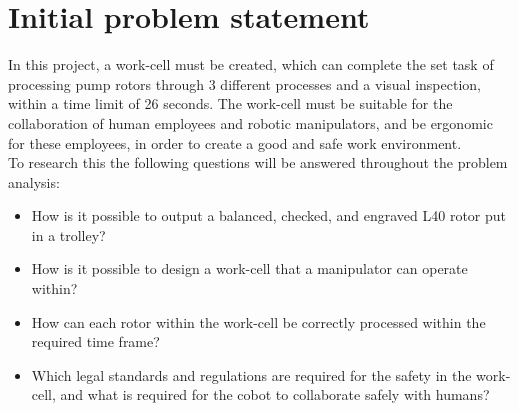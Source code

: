 
\newpage
\section{Initial problem statement}\label{ch:Initial problem statment}


In this project, a work-cell must be created, which can complete the set task of processing pump rotors through 3 different processes and a visual inspection, within a time limit of 26 seconds. The work-cell must be suitable for the collaboration of human employees and robotic manipulators, and be ergonomic for these employees, in order to create a good and safe work environment. \\
To research this the following questions will be answered throughout the problem analysis:

\begin{itemize}

    \item How is it possible to output a balanced, checked, and engraved L40 rotor put in a trolley?
    \item How is it possible to design a work-cell that a manipulator can operate within?
    \item How can each rotor within the work-cell be correctly processed within the required time frame?
    \item  Which legal standards and regulations are required for the safety in the work-cell, and what is required for the cobot to collaborate safely with humans?
\end{itemize}

